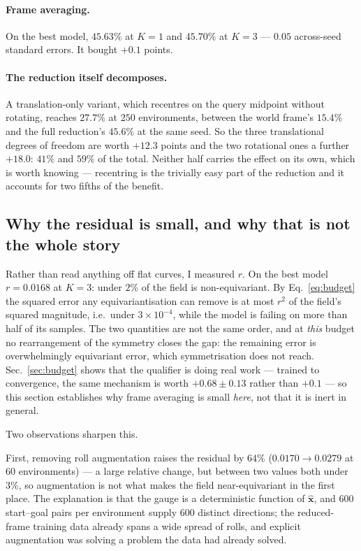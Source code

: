 \documentclass[11pt,a4paper]{article}
\newcommand{\xhat}{\hat{\mathbf{x}}}
\begin{document}
\paragraph{Frame averaging.} On the best model, $45.63\%$ at $K=1$ and $45.70\%$
at $K=3$ --- $0.05$ across-seed standard errors. It bought $+0.1$ points.

\paragraph{The reduction itself decomposes.} A translation-only variant, which
recentres on the query midpoint without rotating, reaches $27.7\%$ at $250$
environments, between the world frame's $15.4\%$ and the full reduction's
$45.6\%$ at the same seed. So the three translational degrees of freedom are
worth $+12.3$ points
and the two rotational ones a further $+18.0$: $41\%$ and $59\%$ of the total.
Neither half carries the effect on its own, which is worth knowing --- recentring
is the trivially easy part of the reduction and it accounts for two fifths of the
benefit.

\subsection{Why the residual is small, and why that is not the whole story}

Rather than read anything off flat curves, I measured $r$. On the best model
$r = 0.0168$ at $K=3$: under $2\%$ of the field is non-equivariant. By
Eq.~\eqref{eq:budget} the squared error any equivariantisation can remove is at
most $r^2$ of the field's squared magnitude, i.e.\ under $3 \times 10^{-4}$,
while the model is failing on more than half of its samples. The two quantities
are not the same order, and at \emph{this} budget no rearrangement of the
symmetry closes the gap: the remaining error is overwhelmingly equivariant error,
which symmetrisation does not reach. Sec.~\ref{sec:budget} shows that the
qualifier is doing real work --- trained to convergence, the same mechanism is
worth $+0.68 \pm 0.13$ rather than $+0.1$ --- so this section establishes why
frame averaging is small \emph{here}, not that it is inert in general.

Two observations sharpen this.

First, removing roll augmentation raises the residual by $64\%$ ($0.0170 \to
0.0279$ at $60$ environments) --- a large relative change, but between two values
both under $3\%$, so augmentation is not what makes the field near-equivariant in
the first place. The explanation is that the gauge is a deterministic function of
$\xhat$, and $600$ start--goal pairs per environment supply $600$ distinct
directions; the reduced-frame training data already spans a wide spread of rolls,
and explicit augmentation was solving a problem the data had already solved.
\end{document}
